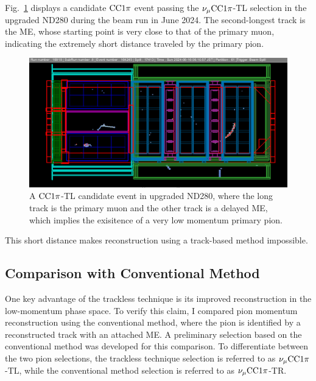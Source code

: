           Fig.~\ref{fig:cc1pi-tl} displays a candidate $\textrm{CC}1\pi$ event passing the $\nu_{\mu}\textrm{CC}1\pi$-TL selection in the upgraded ND280 during the beam run in June 2024. 
          The second-longest track is the ME, whose starting point is very close to that of the primary muon, indicating the extremely short distance traveled by the primary pion. 
          \begin{figure}[!htb] 	
               \centering 		
               \includegraphics[width=\sgfigwid\textwidth]{figures/shortPion.png}
               \caption{\label{fig:cc1pi-tl} A $\textrm{CC}1\pi$-TL candidate event in upgraded ND280, where the long track is the primary muon and the other track is a delayed ME, which implies the exisitence of a very low momentum primary pion.} 
          \end{figure}
          This short distance makes reconstruction using a track-based method impossible.

     \subsection{Comparison with Conventional Method}
     \label{sec:comparison-conventional}

          One key advantage of the trackless technique is its improved reconstruction in the low-momentum phase space. 
          To verify this claim, I compared pion momentum reconstruction using the conventional method, where the pion is identified by a reconstructed track with an attached ME. 
          A preliminary selection based on the conventional method was developed for this comparison. 
          To differentiate between the two pion selections, the trackless technique selection is referred to as $\nu_{\mu}\textrm{CC}1\pi$-TL, while the conventional method selection is referred to as $\nu_{\mu}\textrm{CC}1\pi$-TR.

